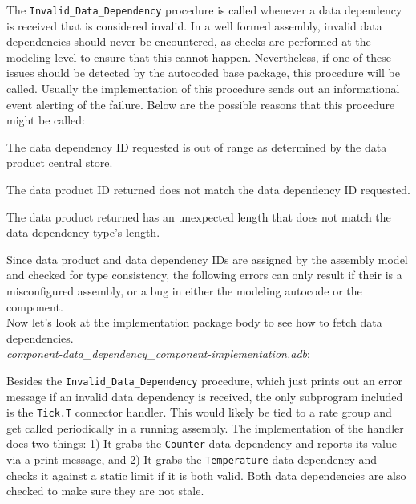 The \texttt{Invalid\_Data\_Dependency} procedure is called whenever a data dependency is received that is considered invalid. In a well formed assembly, invalid data dependencies should never be encountered, as checks are performed at the modeling level to ensure that this cannot happen. Nevertheless, if one of these issues should be detected by the autocoded base package, this procedure will be called. Usually the implementation of this procedure sends out an informational event alerting of the failure. Below are the possible reasons that this procedure might be called:

\vspace{5mm} %
\begin{spaceditemize}
  \item The data dependency ID requested is out of range as determined by the data product central store.
  \item The data product ID returned does not match the data dependency ID requested.
  \item The data product returned has an unexpected length that does not match the data dependency type's length.
\end{spaceditemize}
\vspace{5mm} %

Since data product and data dependency IDs are assigned by the assembly model and checked for type consistency, the following errors can only result if their is a misconfigured assembly, or a bug in either the modeling autocode or the component. \\

Now let's look at the implementation package body to see how to fetch data dependencies. \\

\textit{component-data\_dependency\_component-implementation.adb}:

Besides the \texttt{Invalid\_Data\_Dependency} procedure, which just prints out an error message if an invalid data dependency is received, the only subprogram included is the \texttt{Tick.T} connector handler. This would likely be tied to a rate group and get called periodically in a running assembly. The implementation of the handler does two things: 1) It grabs the \texttt{Counter} data dependency and reports its value via a print message, and 2) It grabs the \texttt{Temperature} data dependency and checks it against a static limit if it is both valid. Both data dependencies are also checked to make sure they are not stale. \\

